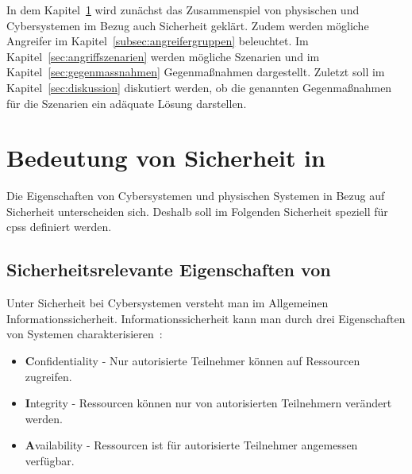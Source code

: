 \documentclass[final,bibliography=totocnumbered]{include/sikseminar}
\newcommand{\fb}[1]{\dofb#1}
\newcommand{\cps}{\glspl{cps}\xspace}
\newcommand{\dofb}[1]{\textbf{#1}\nobreak\hspace{0pt}}
\begin{document}
In dem Kapitel~\ref{sec:bedeutung-sicherheit} wird zunächst das Zusammenspiel von physischen und Cybersystemen im Bezug auch Sicherheit geklärt.
Zudem werden mögliche Angreifer im Kapitel~\ref{subsec:angreifergruppen} beleuchtet.
Im Kapitel~\ref{sec:angriffszenarien} werden mögliche Szenarien und im Kapitel~\ref{sec:gegenmassnahmen} Gegenmaßnahmen dargestellt.
Zuletzt soll im Kapitel~\ref{sec:diskussion} diskutiert werden, ob die genannten Gegenmaßnahmen für die Szenarien ein adäquate Lösung darstellen.

\section{Bedeutung von Sicherheit in }\label{sec:bedeutung-sicherheit}

Die Eigenschaften von Cybersystemen und physischen Systemen in Bezug auf Sicherheit unterscheiden sich.
Deshalb soll im Folgenden Sicherheit speziell für \cps definiert werden.

\subsection{Sicherheitsrelevante Eigenschaften von }\label{subsec:definition}
Unter Sicherheit bei Cybersystemen versteht man im Allgemeinen Informationssicherheit.
Informationssicherheit kann man durch drei Eigenschaften von Systemen charakterisieren~\cite{CH13}:
\begin{itemize}[noitemsep,wide=0pt]
    \item \fb{Confidentiality} - Nur autorisierte Teilnehmer können auf Ressourcen zugreifen.\label{def:confidentiality}
    \item \fb{Integrity} - Ressourcen können nur von autorisierten Teilnehmern verändert werden.\label{def:integrity}
    \item \fb{Availability} - Ressourcen ist für autorisierte Teilnehmer angemessen verfügbar.\label{def:availability}
\end{itemize}
\end{document}
